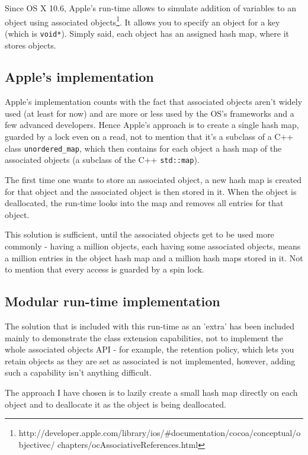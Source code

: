 Since OS X 10.6, Apple's run-time allows to simulate addition of variables to an object using associated objects\footnote{http://developer.apple.com/library/ios/#documentation/cocoa/conceptual/objectivec/ chapters/ocAssociativeReferences.html}. It allows you to specify an object for a key (which is \verb=void*=). Simply said, each object has an assigned hash map, where it stores objects.

\subsection{Apple's implementation}

Apple's implementation counts with the fact that associated objects aren't widely used (at least for now) and are more or less used by the OS's frameworks and a few advanced developers. Hence Apple's approach is to create a single hash map, guarded by a lock even on a read, not to mention that it's a subclass of a C++ class \verb=unordered_map=, which then contains for each object a hash map of the associated objects (a subclass of the C++ \verb=std::map=). 

The first time one wants to store an associated object, a new hash map is created for that object and the associated object is then stored in it. When the object is deallocated, the run-time looks into the map and removes all entries for that object.

This solution is sufficient, until the associated objects get to be used more commonly - having a million objects, each having some associated objects, means a million entries in the object hash map and a million hash maps stored in it. Not to mention that every access is guarded by a spin lock.

\subsection{Modular run-time implementation}

The solution that is included with this run-time as an 'extra' has been included mainly to demonstrate the class extension capabilities, not to implement the whole associated objects API - for example, the retention policy, which lets you retain objects as they are set as associated is not implemented, however, adding such a capability isn't anything difficult.

The approach I have chosen is to lazily create a small hash map directly on each object and to deallocate it as the object is being deallocated.

